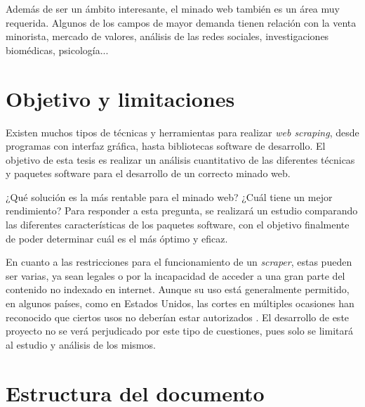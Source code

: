 Además de ser un ámbito interesante, el minado web también es un área muy requerida. Algunos de los campos
de mayor demanda tienen relación con la venta minorista, mercado de valores, análisis de las redes sociales,
investigaciones biomédicas, psicología...

\section{Objetivo y limitaciones}
\label{sec:objetivo y limitaciones}

Existen muchos tipos de técnicas y herramientas para realizar \emph{web scraping}, desde programas con 
interfaz gráfica, hasta bibliotecas software de desarrollo. El objetivo de esta tesis es realizar un análisis
cuantitativo de las diferentes técnicas y paquetes software para el desarrollo de un correcto minado web.

¿Qué solución es la más rentable para el minado web? ¿Cuál tiene un mejor rendimiento? Para responder a
esta pregunta, se realizará un estudio comparando las diferentes características de los paquetes software,
con el objetivo finalmente de poder determinar cuál es el más óptimo y eficaz.

En cuanto a las restricciones para el funcionamiento de un \emph{scraper}, estas pueden ser varias, ya sean
legales o por la incapacidad de acceder a una gran parte del contenido no indexado en internet. Aunque su
uso está generalmente permitido, en algunos países, como en Estados Unidos, las cortes en múltiples 
ocasiones han reconocido que ciertos usos no deberían estar autorizados \cite{Andreas-Mehlfuhrer}. El 
desarrollo de este proyecto no se verá perjudicado por este tipo de cuestiones, pues solo se limitará al 
estudio y análisis de los mismos.

\section{Estructura del documento}
\label{sec:estructura del documento}

